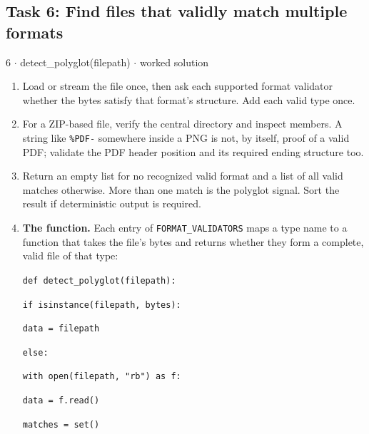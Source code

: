 \documentclass[11pt]{article}
\begin{document}
\begin{keepsection}\subsection{Task 6: Find files that validly match multiple formats}

\begin{workedbox}{6 \ensuremath{\cdot} detect\_polyglot(filepath) \ensuremath{\cdot} worked solution}
\begin{enumerate}
\item Load or stream the file once, then ask each supported format validator whether the bytes satisfy that format’s structure. Add each valid type once.
\item For a ZIP-based file, verify the central directory and inspect members. A string like \texttt{\%PDF-} somewhere inside a PNG is not, by itself, proof of a valid PDF; validate the PDF header position and its required ending structure too.
\item Return an empty list for no recognized valid format and a list of all valid matches otherwise. More than one match is the polyglot signal. Sort the result if deterministic output is required.
\item {}
\textbf{The function.} Each entry of \texttt{FORMAT\_VALIDATORS} maps a type name to a function that takes the file's bytes and returns whether they form a complete, valid file of that type:
\begin{tcolorbox}[colback=Paperblue,colframe=Paperblue,boxrule=0pt,arc=0pt,left=7pt,right=7pt,top=5pt,bottom=5pt]\small\sloppy
\noindent\hspace*{0em}\texttt{def detect\_polyglot(filepath):}\par
\noindent\hspace*{1em}\texttt{if isinstance(filepath, bytes):}\par
\noindent\hspace*{3em}\texttt{data = filepath}\par
\noindent\hspace*{1em}\texttt{else:}\par
\noindent\hspace*{3em}\texttt{with open(filepath, "rb") as f:}\par
\noindent\hspace*{5em}\texttt{data = f.read()}\par
\noindent\hspace*{1em}\texttt{matches = set()}\par

\end{tcolorbox}
\end{enumerate}
\end{workedbox}
\end{keepsection}
\end{document}

